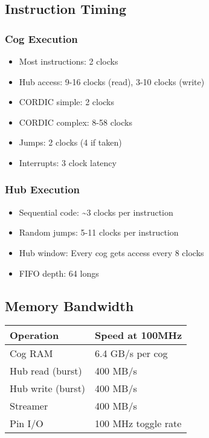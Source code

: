 \documentclass[11pt]{book}
\providecommand{\tightlist}{%
  \setlength{\itemsep}{0pt}\setlength{\parskip}{0pt}}
\begin{document}
\hypertarget{instruction-timing}{%
\subsection{Instruction Timing}\label{instruction-timing}}

\hypertarget{cog-execution}{%
\subsubsection{Cog Execution}\label{cog-execution}}

\begin{itemize}
\tightlist
\item
  Most instructions: 2 clocks
\item
  Hub access: 9-16 clocks (read), 3-10 clocks (write)
\item
  CORDIC simple: 2 clocks
\item
  CORDIC complex: 8-58 clocks
\item
  Jumps: 2 clocks (4 if taken)
\item
  Interrupts: 3 clock latency
\end{itemize}

\hypertarget{hub-execution}{%
\subsubsection{Hub Execution}\label{hub-execution}}

\begin{itemize}
\tightlist
\item
  Sequential code: \textasciitilde{}3 clocks per instruction
\item
  Random jumps: 5-11 clocks per instruction
\item
  Hub window: Every cog gets access every 8 clocks
\item
  FIFO depth: 64 longs
\end{itemize}

\hypertarget{memory-bandwidth}{%
\subsection{Memory Bandwidth}\label{memory-bandwidth}}

\begin{longtable}[]{@{}ll@{}}
\toprule
Operation & Speed at 100MHz \\
\midrule
\endhead
Cog RAM & 6.4 GB/s per cog \\
Hub read (burst) & 400 MB/s \\
Hub write (burst) & 400 MB/s \\
Streamer & 400 MB/s \\
Pin I/O & 100 MHz toggle rate \\
\bottomrule
\end{longtable}
\end{document}
